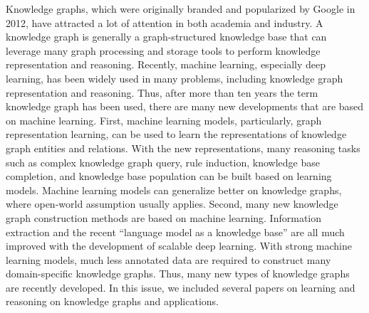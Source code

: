 \documentclass[11pt]{article}
\begin{document}
Knowledge graphs, which were originally branded and popularized by Google in 2012, have attracted a lot of attention in both academia and industry. A knowledge graph is generally a graph-structured knowledge base that can leverage many graph processing and storage tools to perform knowledge representation and reasoning. Recently, machine learning, especially deep learning, has been widely used in many problems, including knowledge graph representation and reasoning. Thus, after more than ten years the term knowledge graph has been used, there are many new developments that are based on machine learning. First, machine learning models, particularly, graph representation learning, can be used to learn the representations of knowledge graph entities and relations. With the new representations, many reasoning tasks such as complex knowledge graph query, rule induction, knowledge base completion, and knowledge base population can be built based on learning models. Machine learning models can generalize better on knowledge graphs, where open-world assumption usually applies. Second, many new knowledge graph construction methods are based on machine learning. Information extraction and the recent ``language model as a knowledge base'' are all much improved with the development of scalable deep learning. With strong machine learning models, much less annotated data are required to construct many domain-specific knowledge graphs. Thus, many new types of knowledge graphs are recently developed. In this issue, we included several papers on learning and reasoning on knowledge graphs and applications.
\end{document}
